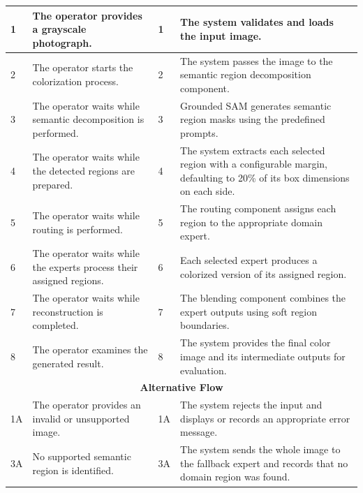 \documentclass{FastFyp}
\begin{document}
\begin{longtable}{|p{0.7cm}|p{2.7cm}|p{3.5cm}|p{0.8cm}|p{5.7cm}|}
1 &
\multicolumn{2}{p{6.2cm}|}{
The operator provides a grayscale photograph.
} &
1 &
The system validates and loads the input image. \\ \hline

2 &
\multicolumn{2}{p{6.2cm}|}{
The operator starts the colorization process.
} &
2 &
The system passes the image to the semantic region decomposition component. \\ \hline

3 &
\multicolumn{2}{p{6.2cm}|}{
The operator waits while semantic decomposition is performed.
} &
3 &
Grounded SAM generates semantic region masks using the predefined prompts. \\ \hline

4 &
\multicolumn{2}{p{6.2cm}|}{
The operator waits while the detected regions are prepared.
} &
4 &
The system extracts each selected region with a configurable margin, defaulting to 20\% of its box dimensions on each side. \\ \hline

5 &
\multicolumn{2}{p{6.2cm}|}{
The operator waits while routing is performed.
} &
5 &
The routing component assigns each region to the appropriate domain expert. \\ \hline

6 &
\multicolumn{2}{p{6.2cm}|}{
The operator waits while the experts process their assigned regions.
} &
6 &
Each selected expert produces a colorized version of its assigned region. \\ \hline

7 &
\multicolumn{2}{p{6.2cm}|}{
The operator waits while reconstruction is completed.
} &
7 &
The blending component combines the expert outputs using soft region boundaries. \\ \hline

8 &
\multicolumn{2}{p{6.2cm}|}{
The operator examines the generated result.
} &
8 &
The system provides the final color image and its intermediate outputs for evaluation. \\ \hline

\multicolumn{5}{|c|}{\textbf{Alternative Flow}} \\ \hline

1A &
\multicolumn{2}{p{6.2cm}|}{
The operator provides an invalid or unsupported image.
} &
1A &
The system rejects the input and displays or records an appropriate error message. \\ \hline

3A &
\multicolumn{2}{p{6.2cm}|}{
No supported semantic region is identified.
} &
3A &
The system sends the whole image to the fallback expert and records that no domain region was found. \\ \hline


\end{longtable}
\end{document}
